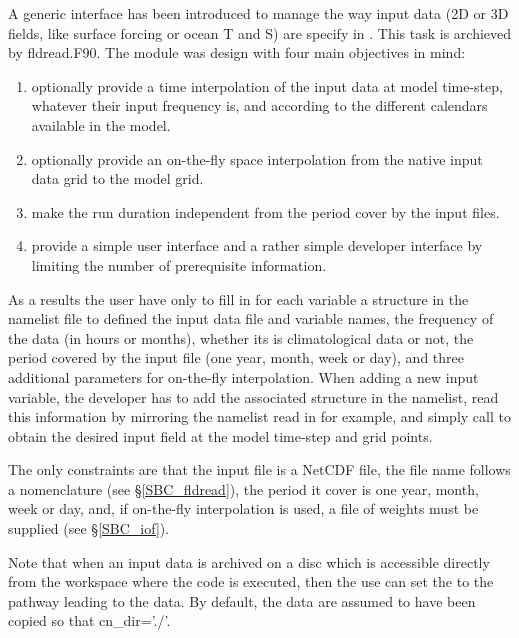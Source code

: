\documentclass[NEMO_book]{subfiles}
\begin{document}
A generic interface has been introduced to manage the way input data (2D or 3D fields, 
like surface forcing or ocean T and S) are specify in \NEMO. This task is archieved by fldread.F90. 
The module was design with four main objectives in mind: 
\begin{enumerate}  
\item optionally provide a time interpolation of the input data at model time-step, 
whatever their input frequency is, and according to the different calendars available in the model.
\item optionally provide an on-the-fly space interpolation from the native input data grid to the model grid.
\item make the run duration independent from the period cover by the input files.
\item provide a simple user interface and a rather simple developer interface by limiting the 
 number of prerequisite information. 
\end{enumerate}  

As a results the user have only to fill in for each variable a structure in the namelist file 
to defined the input data file and variable names, the frequency of the data (in hours or months), 
whether its is climatological data or not, the period covered by the input file (one year, month, week or day), 
and three additional parameters for on-the-fly interpolation. When adding a new input variable, 
the developer has to add the associated structure in the namelist, read this information 
by mirroring the namelist read in  for example, and simply call  
to obtain the desired input field at the model time-step and grid points.

The only constraints are that the input file is a NetCDF file, the file name follows a nomenclature 
(see \S\ref{SBC_fldread}), the period it cover is one year, month, week or day, and, if on-the-fly 
interpolation is used, a file of weights must be supplied (see \S\ref{SBC_iof}).

Note that when an input data is archived on a disc which is accessible directly 
from the workspace where the code is executed, then the use can set the  
to the pathway leading to the data. By default, the data are assumed to have been 
copied so that cn\_dir='./'.

\end{document}
